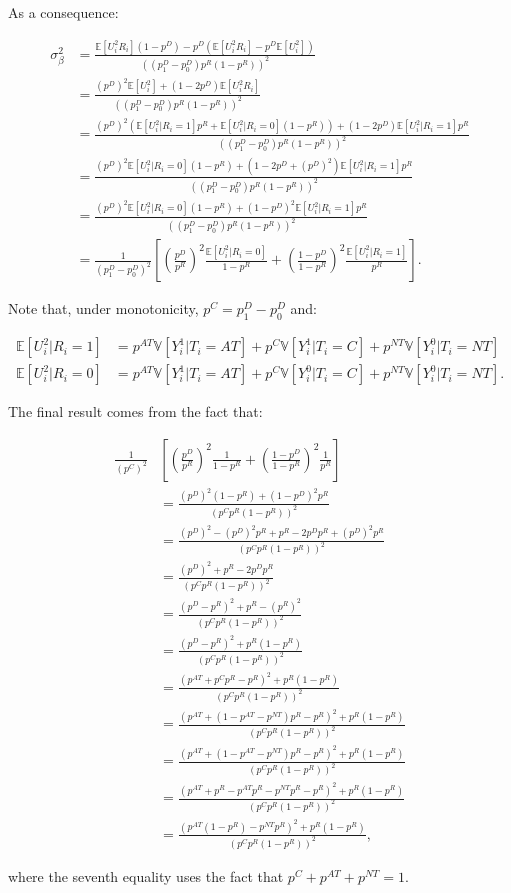 \documentclass[
]{book}
\newcommand{\esp}[1]{\mathbb{E}[ #1 ]}
\newcommand{\var}[1]{\mathbb{V}[ #1 ]}
\theoremstyle{definition}
\theoremstyle{definition}
\theoremstyle{definition}
\theoremstyle{definition}
\theoremstyle{remark}
\begin{document}
As a consequence:

\begin{align*}
\sigma^2_{\beta} & = \frac{\esp{U_i^2R_i}(1-p^D) - p^{D}(\esp{U_i^2R_i}-p^D\esp{U_i^2})}{((p^D_1-p^D_0)p^R(1-p^R))^2} \\
                  & = \frac{(p^D)^2\esp{U_i^2}+(1-2p^D)\esp{U_i^2R_i}}{((p^D_1-p^D_0)p^R(1-p^R))^2}\\
                  & = \frac{(p^D)^2(\esp{U_i^2|R_i=1}p^R+\esp{U_i^2|R_i=0}(1-p^R))+(1-2p^D)\esp{U_i^2|R_i=1}p^R}{((p^D_1-p^D_0)p^R(1-p^R))^2}\\
                  & = \frac{(p^D)^2\esp{U_i^2|R_i=0}(1-p^R)+(1-2p^D+(p^D)^2)\esp{U_i^2|R_i=1}p^R}{((p^D_1-p^D_0)p^R(1-p^R))^2}\\
                  & = \frac{(p^D)^2\esp{U_i^2|R_i=0}(1-p^R)+(1-p^D)^2\esp{U_i^2|R_i=1}p^R}{((p^D_1-p^D_0)p^R(1-p^R))^2}\\
                  & = \frac{1}{(p^D_1-p^D_0)^2}\left[\left(\frac{p^D}{p^R}\right)^2\frac{\esp{U_i^2|R_i=0}}{1-p^R}+\left(\frac{1-p^D}{1-p^R}\right)^2\frac{\esp{U_i^2|R_i=1}}{p^R}\right].
\end{align*}

Note that, under monotonicity, \(p^C=p^D_1-p^D_0\) and:

\begin{align*}
\esp{U_i^2|R_i=1} & = p^{AT}\var{Y_i^1|T_i=AT}+p^C\var{Y_i^1|T_i=C}+p^{NT}\var{Y_i^0|T_i=NT} \\
\esp{U_i^2|R_i=0}  & = p^{AT}\var{Y_i^1|T_i=AT}+p^C\var{Y_i^0|T_i=C}+p^{NT}\var{Y_i^0|T_i=NT}.
 \end{align*}

The final result comes from the fact that:

\begin{align*}
\frac{1}{(p^C)^2} &  \left[\left(\frac{p^D}{p^R}\right)^2\frac{1}{1-p^R}+\left(\frac{1-p^D}{1-p^R}\right)^2\frac{1}{p^R}\right]\\
  & = \frac{(p^D)^2(1-p^R)+(1-p^D)^2p^R}{(p^Cp^R(1-p^R))^2} \\
  & = \frac{(p^D)^2-(p^D)^2p^R+p^R-2p^Dp^R+(p^D)^2p^R}{(p^Cp^R(1-p^R))^2} \\
  & = \frac{(p^D)^2+p^R-2p^Dp^R}{(p^Cp^R(1-p^R))^2} \\
  & = \frac{(p^D-p^R)^2+p^R-(p^R)^2}{(p^Cp^R(1-p^R))^2} \\
  & = \frac{(p^D-p^R)^2+p^R(1-p^R)}{(p^Cp^R(1-p^R))^2} \\
  & = \frac{(p^{AT}+p^Cp^R-p^R)^2+p^R(1-p^R)}{(p^Cp^R(1-p^R))^2} \\
  & = \frac{(p^{AT}+(1-p^{AT}-p^{NT})p^R-p^R)^2+p^R(1-p^R)}{(p^Cp^R(1-p^R))^2} \\
  & = \frac{(p^{AT}+(1-p^{AT}-p^{NT})p^R-p^R)^2+p^R(1-p^R)}{(p^Cp^R(1-p^R))^2} \\
  & = \frac{(p^{AT}+p^R-p^{AT}p^R-p^{NT}p^R-p^R)^2+p^R(1-p^R)}{(p^Cp^R(1-p^R))^2} \\
  & = \frac{(p^{AT}(1-p^R)-p^{NT}p^R)^2+p^R(1-p^R)}{(p^Cp^R(1-p^R))^2},
\end{align*}

where the seventh equality uses the fact that \(p^C+p^{AT}+p^{NT}=1\).
\end{document}
